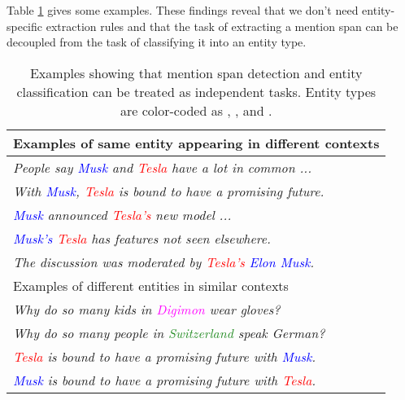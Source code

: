Table \ref{tab:findings} gives some examples. These findings reveal that we don't need entity-specific extraction rules and that the task of extracting a mention span can be decoupled from the task of classifying it into an entity type. 
\begin{table}[htbp]
\centering
\begin{small}
\begin{tabular}{l}\toprule
 Examples of same entity appearing in different contexts \\\midrule
    \textit{People say \textcolor{blue}{Musk} and \textcolor{red}{Tesla} have a lot in common ...} \\
    \textit{With \textcolor{blue}{Musk}, \textcolor{red}{Tesla} is bound to have a promising future.} \\
    \textit{\textcolor{blue}{Musk} announced \textcolor{red}{Tesla's} new model ...} \\
     \textit{\textcolor{blue}{Musk's} \textcolor{red}{Tesla} has features not seen elsewhere.} \\
    \textit{The discussion was moderated by \textcolor{red}{Tesla's} \textcolor{blue}{Elon Musk}.} \\ \midrule \midrule
Examples of different entities in similar contexts \\ \midrule
\textit{Why do so many kids in \textcolor{magenta}{Digimon} wear gloves?} \\
\textit{Why do so many people in \textcolor{ForestGreen}{Switzerland} speak German?} \\
 \textit{\textcolor{red}{Tesla} %
 is bound to have a promising future with \textcolor{blue}{Musk}.} \\ %
 \textit{\textcolor{blue}{Musk} %
 is bound to have a promising future with \textcolor{red}{Tesla}.} %
 \\ \bottomrule
\end{tabular}
\caption{Examples showing that mention span detection and entity classification can be treated as independent tasks. Entity types are color-coded as \textcolor{blue}{}, \textcolor{red}{}, \textcolor{magenta}{} and \textcolor{ForestGreen}{}.}
    \label{tab:findings}
\end{small}
\end{table}


